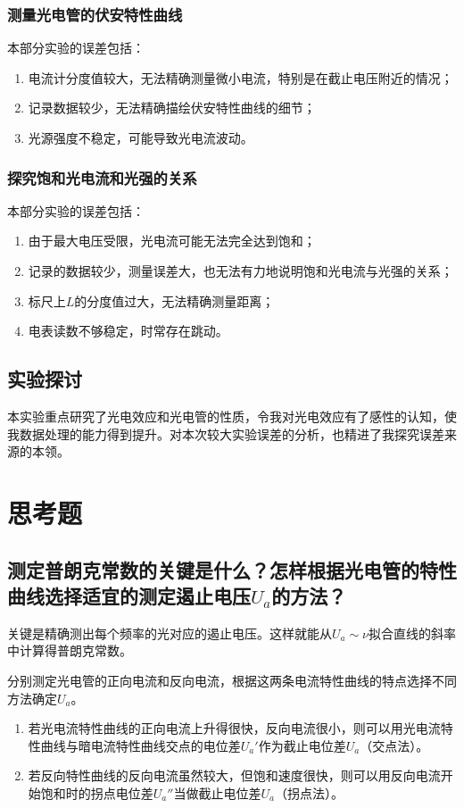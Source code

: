 \documentclass[]{../../templates/Report}%
\begin{document}
\begin{fullreportonly}
\subsubsection{测量光电管的伏安特性曲线}
本部分实验的误差包括：
\begin{enumerate}
    \item 电流计分度值较大，无法精确测量微小电流，特别是在截止电压附近的情况；
    \item 记录数据较少，无法精确描绘伏安特性曲线的细节；
    \item 光源强度不稳定，可能导致光电流波动。
\end{enumerate}

\subsubsection{探究饱和光电流和光强的关系}
本部分实验的误差包括：
\begin{enumerate}
    \item 由于最大电压受限，光电流可能无法完全达到饱和；
    \item 记录的数据较少，测量误差大，也无法有力地说明饱和光电流与光强的关系；
    \item 标尺上$L$的分度值过大，无法精确测量距离；
    \item 电表读数不够稳定，时常存在跳动。
\end{enumerate}

\subsection{实验探讨}
本实验重点研究了光电效应和光电管的性质，令我对光电效应有了感性的认知，使我数据处理的能力得到提升。对本次较大实验误差的分析，也精进了我探究误差来源的本领。

\section{思考题}
\subsection{测定普朗克常数的关键是什么？怎样根据光电管的特性曲线选择适宜的测定遏止电压$U_a$的方法？}

关键是精确测出每个频率的光对应的遏止电压。这样就能从$U_a \sim \nu$拟合直线的斜率中计算得普朗克常数。

分别测定光电管的正向电流和反向电流，根据这两条电流特性曲线的特点选择不同方法确定$U_a$。
\begin{enumerate}
    \item 若光电流特性曲线的正向电流上升得很快，反向电流很小，则可以用光电流特性曲线与暗电流特性曲线交点的电位差$U_a'$作为截止电位差$U_a$（交点法）。
    \item 若反向特性曲线的反向电流虽然较大，但饱和速度很快，则可以用反向电流开始饱和时的拐点电位差$U_a''$当做截止电位差$U_a$（拐点法）。
\end{enumerate}


\end{fullreportonly}
\end{document}
